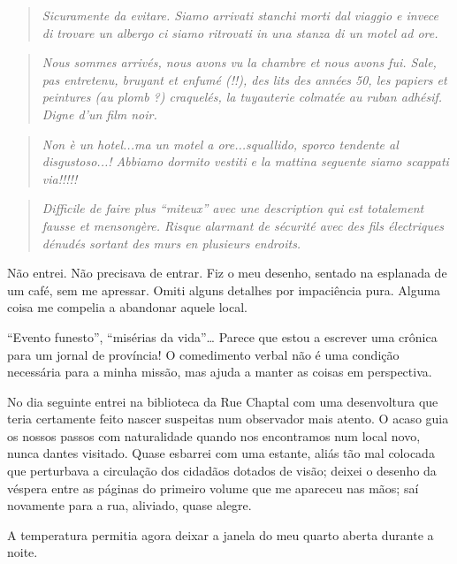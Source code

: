 \begin{quote}
\emph{Sicuramente da evitare. Siamo arrivati stanchi morti dal viaggio e
invece di trovare un albergo ci siamo ritrovati in una stanza di un
motel ad ore.}
\end{quote}

\begin{quote}
\emph{Nous sommes arrivés, nous avons vu la chambre et nous avons fui.
Sale, pas entretenu, bruyant et enfumé (!!), des lits des années 50, les
papiers et peintures (au plomb ?) craquelés, la tuyauterie colmatée au
ruban adhésif. Digne d'un film noir.}
\end{quote}

\begin{quote}
\emph{Non è un hotel...ma un motel a ore...squallido, sporco tendente
al disgustoso...! Abbiamo dormito vestiti e la mattina seguente siamo
scappati via!!!!!}
\end{quote}

\begin{quote}
\emph{Difficile de faire plus ``miteux'' avec une description qui est
totalement fausse et mensongère. Risque alarmant de sécurité avec des
fils électriques dénudés sortant des murs en plusieurs endroits.}
\end{quote}

Não entrei. Não precisava de entrar. Fiz o meu desenho, sentado na
esplanada de um café, sem me apressar. Omiti alguns detalhes por
impaciência pura. Alguma coisa me compelia a abandonar aquele local.

``Evento funesto'', ``misérias da vida''\ldots{} Parece que estou a
escrever uma crônica para um jornal de província! O comedimento verbal
não é uma condição necessária para a minha missão, mas ajuda a manter as
coisas em perspectiva.

No dia seguinte entrei na biblioteca da Rue Chaptal com uma desenvoltura
que teria certamente feito nascer suspeitas num observador mais atento.
O acaso guia os nossos passos com naturalidade quando nos encontramos
num local novo, nunca dantes visitado. Quase esbarrei com uma estante,
aliás
tão mal colocada que perturbava a circulação dos cidadãos dotados de
visão; deixei o desenho da véspera entre as páginas do primeiro volume
que me apareceu nas mãos; saí novamente para a rua, aliviado, quase
alegre.

A temperatura permitia agora deixar a janela do meu quarto aberta
durante a noite.

